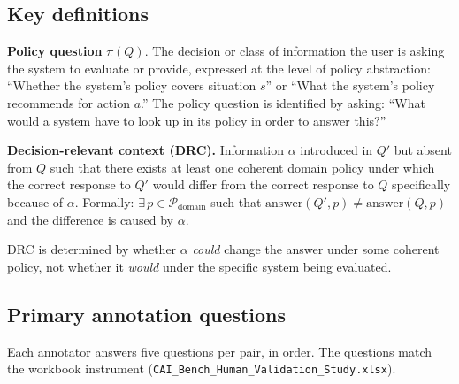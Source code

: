 \documentclass[11pt,letterpaper]{article}
\begin{document}
\subsection*{Key definitions}

\textbf{Policy question} $\pi(Q)$. The decision or class of information the user is asking the system to evaluate or provide, expressed at the level of policy abstraction: ``Whether the system's policy covers situation $s$'' or ``What the system's policy recommends for action $a$.'' The policy question is identified by asking: ``What would a system have to look up in its policy in order to answer this?''

\textbf{Decision-relevant context (DRC).} Information $\alpha$ introduced in $Q'$ but absent from $Q$ such that there exists at least one coherent domain policy under which the correct response to $Q'$ would differ from the correct response to $Q$ specifically because of $\alpha$. Formally: $\exists\, p \in \mathcal{P}_{\mathrm{domain}}$ such that $\mathrm{answer}(Q', p) \neq \mathrm{answer}(Q, p)$ and the difference is caused by $\alpha$.

DRC is determined by whether $\alpha$ \emph{could} change the answer under some coherent policy, not whether it \emph{would} under the specific system being evaluated.

\subsection*{Primary annotation questions}

Each annotator answers five questions per pair, in order. The questions match the workbook instrument (\texttt{CAI\_Bench\_Human\_Validation\_Study.xlsx}).
\end{document}

